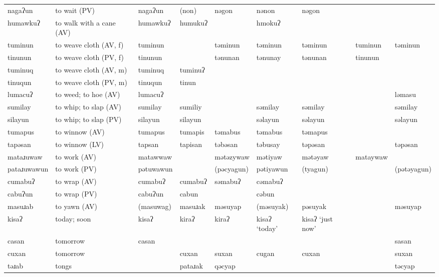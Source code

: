 \begin{landscape}
\begin{longtable}{*{9}{>{\raggedright\arraybackslash}p{}}}
\text{*}nagaʔun      & to wait (PV) & nagaʔun & (non) & nəgon & nənon & nəgon &  & \\
\text{*}humawkuʔ     & to walk with a cane (AV) & humawkuʔ & humukuʔ &  & hmokuʔ &  &  & \\
\text{*}tuminun      & to weave cloth (AV, f) & tuminun &  & təminun & təminun & təminun & tuminun & təminun\\
\text{*}tinunun      & to weave cloth (PV, f) & tinunun &  & tənunan & tənunay & tənunan & tinunun & \\
\text{*}tuminuq      & to weave cloth (AV, m) & tuminuq & tuminuʔ &  &  &  &  & \\
\text{*}tinuqun      & to weave cloth (PV, m) & tinuqun & tinun &  &  &  &  & \\
\text{*}lumacuʔ      & to weed; to hoe (AV) & lumacuʔ &  &  &  &  &  & ləmasu\\
\text{*}sumilay      & to whip; to slap (AV) & sumilay & sumiliy &  & səmilay & səmilay &  & səmilay\\
\text{*}silayun      & to whip; to slap (PV) & silayun & silayun &  & səlayun & səlayun &  & səlayun\\
\text{*}tumapus      & to winnow (AV) & tumapus & tumapis & təmabus & təmabus & təmapus &  & \\
\text{*}tapəsan      & to winnow (LV) & tapsan & tapisan & təbəsan & təbusay & təpəsan &  & təpəsan\\
\text{*}mataɹuwaw    & to work (AV) & matawwaw &  & mətəzywaw & mətiyaw & mətəyaw & mataywaw & \\
\text{*}pataɹuwawun  & to work (PV) & pətuwawun &  & (pəcyagun) & pətiyawun & (tyagun) &  & (pətəyagun)\\
\text{*}cumabuʔ      & to wrap (AV) & cumabuʔ & cumabuʔ & səmabuʔ & cəmabuʔ &  &  & \\
\text{*}cabuʔun      & to wrap (PV) & cabuʔun & cabun &  & cəbun &  &  & \\
\text{*}masuɹab      & to yawn (AV) & (masuwag) & masuɹak & məsuyap & (məsuyak) & pəsuyak &  & məsuyap\\
\text{*}kisaʔ        & today; soon & kisaʔ & kiraʔ & kiraʔ & kisaʔ `today' & kisaʔ \newline `just now' &  & \\
\text{*}casan        & tomorrow & casan &  &  &  &  &  & sasan\\
\text{*}cuxan        & tomorrow &  & cuxan & suxan & cugan & cuxan &  & suxan\\
\text{*}təɹab       & tongs &  & pataɹak & qəcyap &  &  &  & təcyap\\

\end{longtable}
\end{landscape}
